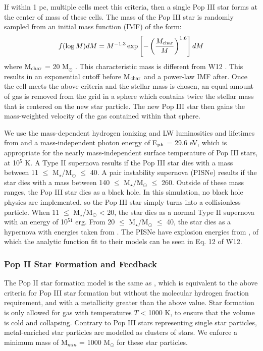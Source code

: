 \documentclass[a4paper,fleqn,usenatbib]{mnras}
\begin{document}
If within 1 pc, multiple cells meet this criteria, then a single Pop III star forms at the center of mass of these cells. The mass of the Pop III star is randomly sampled from an initial mass function (IMF) of the form:
\begin{equation} \label{IMF}
	f(\log M)dM = M^{-1.3} \exp \left[-\left( \frac{M_{\rm char}}{M}\right)^{1.6} \right]dM
\end{equation}
where M$_{\rm char}$ = 20 M$_{\odot}$ \citep{Hirano17}. This characteristic mass is different from W12 \citep{Hirano17}. This results in an exponential cutoff before M$_{\rm char}$ and a power-law IMF after. Once the cell meets the above criteria and the stellar mass is chosen, an equal amount of gas is removed from the grid in a sphere which contains twice the stellar mass that is centered on the new star particle. The new Pop III star then gains the mass-weighted velocity of the gas contained within that sphere.  

We use the mass-dependent hydrogen ionizing and LW luminosities and lifetimes from \citet{Schaerer02} and a mass-independent photon energy of E$_{\rm ph}$ = 29.6 eV, which is appropriate for the nearly mass-independent surface temperature of Pop III stars, at 10$^{5}$ K. A Type II supernova results if the Pop III star dies with a mass between 11 $\leq$ M$_{\star}$/M$_{\odot}$ $\leq$ 40. A pair instability supernova (PISNe) results if the star dies with a mass between 140 $\leq$ M$_{\star}$/M$_{\odot}$ $\leq$ 260. Outside of these mass ranges, the Pop III star dies as a black hole. In this simulation, no black hole physics are implemented, so the Pop III star simply turns into a collisionless particle. When 11 $\leq$ M$_{\star}$/M$_{\odot}$ < 20, the star dies as a normal Type II supernova with an energy of 10$^{51}$ erg. From 20 $\leq$ M$_{\star}$/M$_{\odot}$ $\leq$ 40, the star dies as a hypernova with energies taken from \citet{Nomoto06}. The PISNe have explosion energies from \citet{2002ApJ...567..532H}, of which the analytic function fit to their models can be seen in Eq. 12 of W12. 

\subsubsection{Pop II  Star Formation and Feedback}
The Pop II star formation model is the same as \citet{Wise09}, which is equivalent to the above criteria for Pop III star formation but without the molecular hydrogen fraction requirement, and with a metallicity greater than the above value. Star formation is only allowed for gas with temperatures $T$ < 1000 K, to ensure that the volume is cold and collapsing. Contrary to Pop III stars representing single star particles, metal-enriched star particles are modelled as clusters of stars. We enforce a minimum mass of M$_{min}$ = 1000 M$_{\odot}$ for these star particles. 
\end{document}
